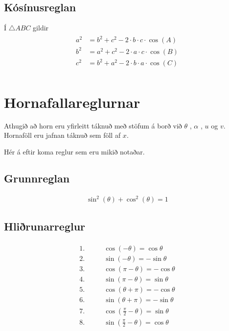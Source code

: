 \documentclass[a4paper,10pt,icelandic]{sphinxmanual}
\begin{document}
\subsection{Kósínusreglan}
\label{\detokenize{Kafli07:kosinusreglan}}
Í \(\triangle ABC\) gildir
\begin{equation*}
\begin{split}\begin{aligned}
a^2 &= b^2+c^2-2\cdot b \cdot c \cdot \cos(A) \\
b^2 &= a^2+c^2-2\cdot a \cdot c \cdot \cos(B) \\
c^2 &= b^2+a^2-2\cdot b \cdot a \cdot \cos(C) \\
\end{aligned}\end{split}
\end{equation*}

\section{Hornafallareglurnar}
\label{\detokenize{Kafli07:hornafallareglurnar}}
Athugið að horn eru yfirleitt táknuð með stöfum á borð við \(\theta\) , \(\alpha\) , \(u\) og \(v\).
Hornaföll eru jafnan táknuð sem föll af \(x\).

Hér á eftir koma reglur sem eru mikið notaðar.


\subsection{Grunnreglan}
\label{\detokenize{Kafli07:grunnreglan}}\begin{equation*}
\begin{split}\sin^2(\theta) + \cos^2(\theta) = 1\end{split}
\end{equation*}

\subsection{Hliðrunarreglur}
\label{\detokenize{Kafli07:hlirunarreglur}}\begin{equation*}
\begin{split}\begin{aligned}
1.& \qquad \cos(-\theta)=\cos \theta\\
2.& \qquad \sin(-\theta)=-\sin\theta\\
3.& \qquad \cos(\pi-\theta)=-\cos \theta\\
4.& \qquad \sin(\pi-\theta)=\sin \theta\\
5.& \qquad \cos(\theta+\pi)=-\cos \theta\\
6.& \qquad \sin(\theta+\pi)=-\sin \theta\\
7.& \qquad \cos\left(\frac{\pi}{2}-\theta\right)=\sin\theta\\
8.& \qquad \sin\left(\frac{\pi}{2}-\theta\right)=\cos\theta
\end{aligned}\end{split}
\end{equation*}
\end{document}
